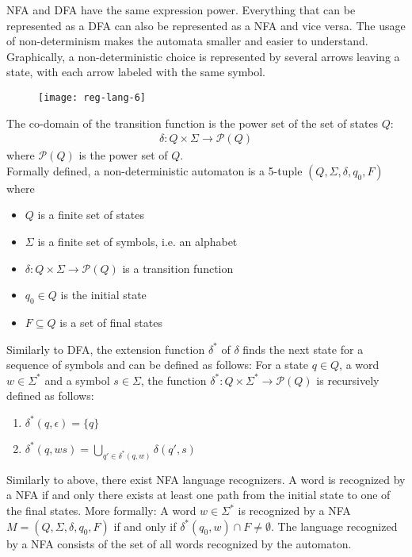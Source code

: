 NFA and DFA have the same expression power. Everything that can be represented as a DFA
can also be represented as a NFA and vice versa.
The usage of non-determinism makes the automata smaller
and easier to understand.\\

Graphically, a non-deterministic choice is represented by several arrows leaving a state, 
with each arrow labeled with the same symbol.
\begin{figure}[H]
  \centering
  \texttt{[image: reg-lang-6]}
\end{figure}
The co-domain of the transition function is the power set of the set of states $Q$:
\begin{align*}
  \delta : Q \times \Sigma \rightarrow \mathcal{P}(Q)
\end{align*}
where $\mathcal{P}(Q)$ is the power set of $Q$.\\
Formally defined, a non-deterministic automaton is a 5-tuple $(Q, \Sigma, \delta, q_0, F)$ where
\begin{itemize}
  \item $Q$ is a finite set of states
  \item $\Sigma$ is a finite set of symbols, i.e. an alphabet
  \item $\delta : Q \times \Sigma \rightarrow \mathcal{P}(Q)$ is a transition function
  \item $q_0 \in Q$ is the initial state
  \item $F \subseteq Q$ is a set of final states
\end{itemize} 
Similarly to DFA, the extension function $\delta^{*}$ of $\delta$ finds the next state
for a sequence of symbols and can be defined as follows:
For a state $q \in Q$, a word $w \in \Sigma^{*}$ and a symbol $s \in \Sigma$,
the function $\delta^{*} : Q \times \Sigma^{*} \rightarrow \mathcal{P}(Q)$ is recursively defined as follows:
\begin{enumerate}
  \item $\delta^{*}(q, \epsilon) = \{q\}$
  \item $\delta^{*}(q, ws) = \bigcup_{q'\in \delta^{*}(q,w)}\delta(q',s) $
\end{enumerate}
Similarly to above, there exist NFA language recognizers. 
A word is recognized by a NFA if and only there exists
at least one path from the initial state to one of the final states.
More formally: A word $w \in \Sigma^{*}$ is recognized by a 
NFA $M = (Q, \Sigma, \delta, q_0, F)$ if and only if 
$\delta^{*}(q_0, w)\cap F \neq \emptyset$. The language recognized by a 
NFA consists of the set of all words recognized by the automaton.\\

